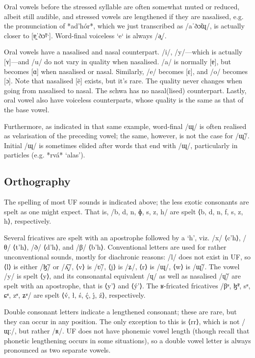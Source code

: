 \documentclass[a4paper, 12pt, oneside, final]{article}
\begin{document}
Oral vowels before the stressed syllable are often somewhat muted or reduced, albeit still audible, and stressed vowels are lengthened if they
are nasalised, e.g. the pronunciation of *ad’hór*, which we just transcribed as /aˈðɔ̃ɰ/, is actually closer to [ɐ̯ˈðɔ̃ˠˑ].
Word-final voiceless `e` is always /ə̥/.

Oral vowels have a nasalised and nasal counterpart. /i/, /y/—which is actually [ʏ]—and /u/ do not vary in quality when nasalised. /a/ is normally [ɐ],
but becomes [ɑ] when nasalised or nasal. Similarly, /e/ becomes [ɛ], and /o/ becomes [ɔ]. Note that nasalised [ẽ] exists, but it’s
rare. The quality never changes when going from nasalised to nasal. The schwa has no nasal(lised) counterpart. Lastly, oral vowel
also have voiceless counterparts, whose quality is the same as that of the base vowel.

Furthermore, as indicated in that same example, word-final /ɰ/ is often realised as velarisation of the preceding vowel;
the same, however, is not the case for /ɰ̃/. Initial /ɰ/ is sometimes elided after words that end with /ɰ/, particularly
in particles (e.g. *rvá* ‘alas’).

\subsection{Orthography}
The spelling of most UF sounds is indicated above; the less exotic consonants are spelt as
one might expect. That is, /b, d, n, ɸ, s, z, h/ are spelt ⟨b, d, n, f, s, z, h⟩, respectively.

Several fricatives are spelt with an apostrophe followed by a ‘h’, viz. /x/ ⟨c’h⟩, /θ/ ⟨t’h⟩, /ð/ ⟨d’h⟩,
and /β/ ⟨b’h⟩. Conventional letters are used for rather unconventional sounds, mostly for diachronic reasons:
/l/ does not exist in UF, so ⟨l⟩ is either /ɮ̃/ or /ʎ̝̃/, ⟨v⟩ is /ʋ̃/, ⟨j⟩ is /ʑ/, ⟨r⟩ is /ɰ/, ⟨w⟩ is /ɰ̃/. The vowel
/y/ is spelt ⟨y⟩, and its consonantal equivalent /ɥ/ as well as nasalised /ɥ̃/ are spelt with an apostrophe, that is
⟨y’⟩ and ⟨ý’⟩. The ʁ-fricated fricatives /βʶ, ɮ̃ʶ, sʶ, ɕʶ, zʶ, ʑʶ/ are spelt ⟨v́, ł, ś, ḉ, ȷ́, ź⟩, respectively.

Double consonant letters indicate a lengthened consonant; these are rare, but they can occur in any position. The only
exception to this is ⟨rr⟩, which is not /ɰː/, but rather /ʀ/. UF does not have phonemic vowel length (though recall
that phonetic lengthening occurs in some situations), so a double vowel letter is always pronounced as two separate vowels.
\end{document}
